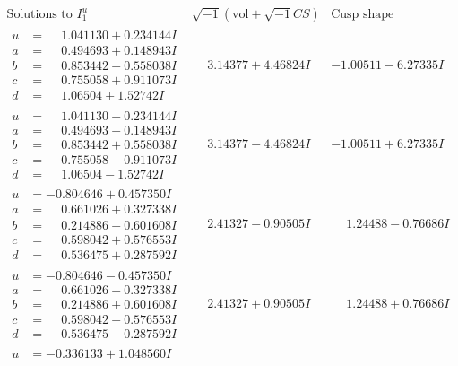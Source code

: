 \documentclass[1p]{elsarticle_modified}
\theoremstyle{definition}
\newcommand{\I}{\sqrt{-1}}
\begin{document}
$$\begin{array}{c|c|c}  
\text{Solutions to }I^u_{1}& \I (\text{vol} + \sqrt{-1}CS) & \text{Cusp shape}\\
 \hline 
\begin{aligned}
u &= \phantom{-}1.041130 + 0.234144 I \\
a &= \phantom{-}0.494693 + 0.148943 I \\
b &= \phantom{-}0.853442 - 0.558038 I \\
c &= \phantom{-}0.755058 + 0.911073 I \\
d &= \phantom{-}1.06504 + 1.52742 I\end{aligned}
 & \phantom{-}3.14377 + 4.46824 I & -1.00511 - 6.27335 I \\ \hline\begin{aligned}
u &= \phantom{-}1.041130 - 0.234144 I \\
a &= \phantom{-}0.494693 - 0.148943 I \\
b &= \phantom{-}0.853442 + 0.558038 I \\
c &= \phantom{-}0.755058 - 0.911073 I \\
d &= \phantom{-}1.06504 - 1.52742 I\end{aligned}
 & \phantom{-}3.14377 - 4.46824 I & -1.00511 + 6.27335 I \\ \hline\begin{aligned}
u &= -0.804646 + 0.457350 I \\
a &= \phantom{-}0.661026 + 0.327338 I \\
b &= \phantom{-}0.214886 - 0.601608 I \\
c &= \phantom{-}0.598042 + 0.576553 I \\
d &= \phantom{-}0.536475 + 0.287592 I\end{aligned}
 & \phantom{-}2.41327 - 0.90505 I & \phantom{-}1.24488 - 0.76686 I \\ \hline\begin{aligned}
u &= -0.804646 - 0.457350 I \\
a &= \phantom{-}0.661026 - 0.327338 I \\
b &= \phantom{-}0.214886 + 0.601608 I \\
c &= \phantom{-}0.598042 - 0.576553 I \\
d &= \phantom{-}0.536475 - 0.287592 I\end{aligned}
 & \phantom{-}2.41327 + 0.90505 I & \phantom{-}1.24488 + 0.76686 I \\ \hline\begin{aligned}
u &= -0.336133 + 1.048560 I \\

\end{aligned}
\end{array}$$
\end{document}
